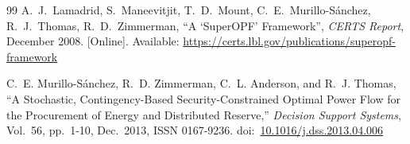 \documentclass[12pt]{article}
\newcommand{\doi}[1]{doi:~\href{https://doi.org/#1}{#1}}
\numberwithin{equation}{section}
\numberwithin{table}{section}
\numberwithin{figure}{section}
\begin{document}
\begin{thebibliography}{99}
A.~J.~Lamadrid, S.~Maneevitjit, T.~D.~Mount, C.~E.~Murillo-S{\'a}nchez,
  R.~J.~Thomas, R.~D.~Zimmerman, ``A `SuperOPF' Framework'', \emph{CERTS
  Report}, December 2008.
  [Online]. Available: \url{https://certs.lbl.gov/publications/superopf-framework}

C.~E. Murillo-S{\'a}nchez, R.~D. Zimmerman, C.~L. Anderson, and R.~J. Thomas, ``A Stochastic, Contingency-Based Security-Constrained Optimal Power Flow for the Procurement of Energy and Distributed Reserve,'' \emph{Decision Support Systems}, Vol.~56, pp.~1-10, Dec.~2013, ISSN 0167-9236.
\doi{10.1016/j.dss.2013.04.006}

\end{thebibliography}
\end{document}
